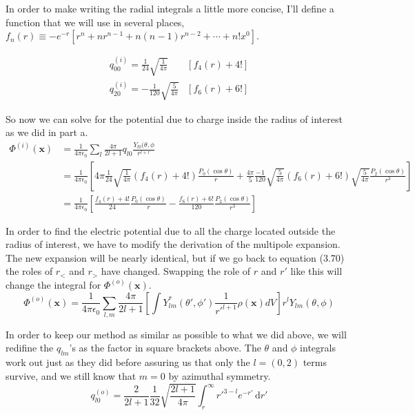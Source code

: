 \documentclass[10pt,a4paper]{article}
\begin{document}
In order to make writing the radial integrals a little more concise, I'll define a function that we will use in several places, $f_n(r)\equiv-e^{-r}[r^n+nr^{n-1}+n(n-1)r^{n-2}+\cdots+n!x^0]$.

\begin{subequations}\begin{align}
q^{(i)}_{00} = \frac{1}{24} \sqrt{\frac{1}{4\pi}}&\left[f_4(r)+4!\right] \\
q^{(i)}_{20} = -\frac{1}{120} \sqrt{\frac{5}{4\pi}}&\left[f_6(r)+6!\right]
\end{align}\end{subequations}

So now we can solve for the potential due to charge inside the radius of interest as we did in part a.
\begin{align}
\Phi^{(i)}(\mathbf{x})&=\frac{1}{4\pi\epsilon_0}\sum_l\frac{4\pi}{2l+1}q_{l0}\frac{Y_{l0}(\theta,\phi}{r^{l+r}} \\
&=\frac{1}{4\pi\epsilon_0}\left[ 4\pi \frac{1}{24}\sqrt{\frac{1}{4\pi}}(f_4(r)+4!)\frac{P_0(\cos\theta)}{r}+\frac{4\pi}{5}\frac{-1}{120}\sqrt{\frac{5}{4\pi}}(f_6(r)+6!)\sqrt{\frac{5}{4\pi}}\frac{P_2(\cos\theta)}{r^3}\right] \\
&=\frac{1}{4\pi\epsilon_0}\left[\frac{f_4(r)+4!}{24}\frac{P_0(\cos\theta)}{r}-\frac{f_6(r)+6!}{120}\frac{P_2(\cos\theta)}{r^3}\right]
\end{align}

In order to find the electric potential due to all the charge located outside the radius of interest, we have to modify the derivation of the multipole expansion.  The new expansion will be nearly identical, but if we go back to equation (3.70) the roles of $r_<$ and $r_>$ have changed.  Swapping the role of $r$ and $r'$ like this will change the integral for $\Phi^{(o)}(\mathbf{x})$.
\begin{equation}
\Phi^{(o)}(\mathbf{x})= \frac{1}{4\pi\epsilon_0}\sum_{l,m}\frac{4\pi}{2l+1}
\left[\int Y^*_{lm}(\theta',\phi')\frac{1}{{r'}^{l+1}}\rho(\mathbf{x})dV\right]
r^lY_{lm}(\theta,\phi)
\end{equation}

In order to keep our method as similar as possible to what we did above, we will redifine the $q_{lm}$'s as the factor in square brackets above.  The $\theta$ and $\phi$ integrals work out just as they did before assuring us that only the $l=(0,2)$ terms survive, and we still know that $m=0$ by azimuthal symmetry.
\begin{equation}
q^{(o)}_{l0}=\frac{2}{2l+1}\frac{1}{32}\sqrt{\frac{2l+1}{4\pi}}\int_r^\infty {r'}^{3-l}e^{-r'}\,\mathrm{d}r'
\end{equation}
\end{document}
